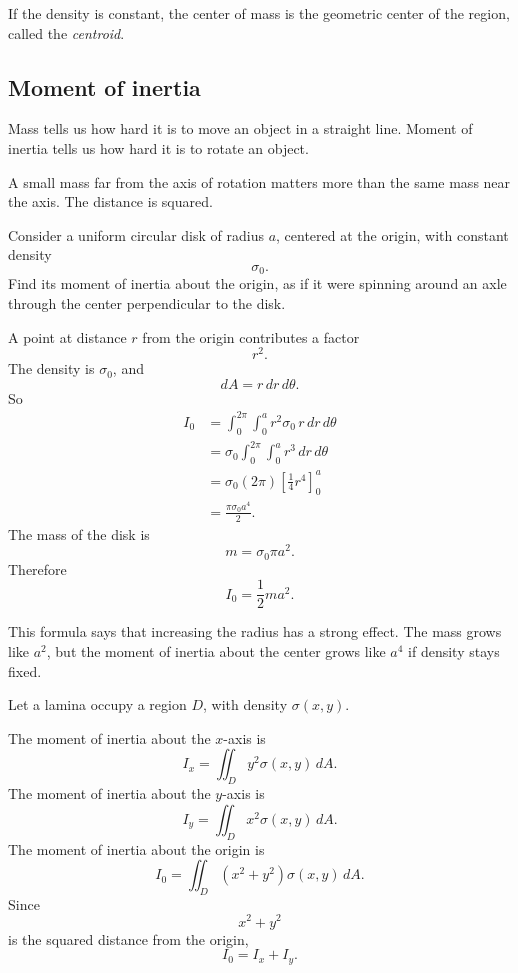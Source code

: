 If the density is constant, the center of mass is the geometric center of the region,
called the \emph{centroid}.

\subsection{Moment of inertia}

Mass tells us how hard it is to move an object in a straight line.  Moment of inertia
tells us how hard it is to rotate an object.

A small mass far from the axis of rotation matters more than the same mass near the
axis.  The distance is squared.

Consider a uniform circular disk of radius \(a\), centered at the origin, with constant
density
\[
    \sigma_0.
\]
Find its moment of inertia about the origin, as if it were spinning around an axle through
the center perpendicular to the disk.

A point at distance \(r\) from the origin contributes a factor
\[
    r^2.
\]
The density is \(\sigma_0\), and
\[
    dA=r\,dr\,d\theta.
\]
So
\[
\begin{aligned}
    I_0
    &=
    \int_0^{2\pi}\int_0^a r^2\sigma_0\,r\,dr\,d\theta\\
    &=
    \sigma_0\int_0^{2\pi}\int_0^a r^3\,dr\,d\theta\\
    &=
    \sigma_0(2\pi)
    \left[
        \frac14r^4
    \right]_0^a\\
    &=
    \frac{\pi\sigma_0a^4}{2}.
\end{aligned}
\]
The mass of the disk is
\[
    m=\sigma_0\pi a^2.
\]
Therefore
\[
\boxed{
    I_0=\frac12ma^2.
}
\]

This formula says that increasing the radius has a strong effect.  The mass grows like
\(a^2\), but the moment of inertia about the center grows like \(a^4\) if density stays
fixed.

\begin{definition}
Let a lamina occupy a region \(D\), with density \(\sigma(x,y)\).

The moment of inertia about the \(x\)-axis is
\[
\boxed{
    I_x=\iint_D y^2\sigma(x,y)\,dA.
}
\]
The moment of inertia about the \(y\)-axis is
\[
\boxed{
    I_y=\iint_D x^2\sigma(x,y)\,dA.
}
\]
The moment of inertia about the origin is
\[
\boxed{
    I_0=\iint_D (x^2+y^2)\sigma(x,y)\,dA.
}
\]
Since
\[
    x^2+y^2
\]
is the squared distance from the origin,
\[
\boxed{
    I_0=I_x+I_y.
}
\]
\end{definition}

